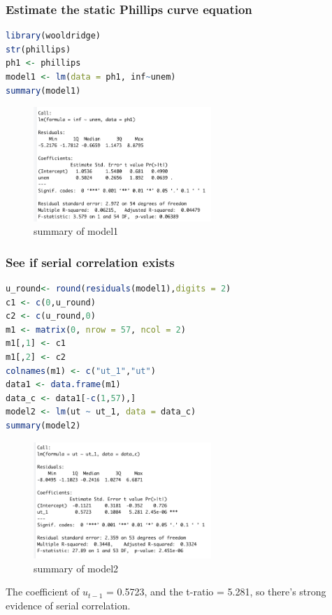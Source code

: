 \documentclass[12pt]{article}
\begin{document}
\subsubsection*{Estimate the static Phillips curve equation}
\begin{lstlisting}[language = R]
library(wooldridge)
str(phillips)
ph1 <- phillips
model1 <- lm(data = ph1, inf~unem)
summary(model1)
\end{lstlisting}
\begin{figure}[H]
    \centering
    \includegraphics*[width = 0.6\textwidth]{M1.png}
    \caption{summary of model1}
\end{figure}
    
\subsubsection*{See if serial correlation exists}
\begin{lstlisting}[language = R]
u_round<- round(residuals(model1),digits = 2)
c1 <- c(0,u_round)
c2 <- c(u_round,0)
m1 <- matrix(0, nrow = 57, ncol = 2)
m1[,1] <- c1
m1[,2] <- c2
colnames(m1) <- c("ut_1","ut")
data1 <- data.frame(m1)
data_c <- data1[-c(1,57),]
model2 <- lm(ut ~ ut_1, data = data_c)
summary(model2)
\end{lstlisting}
\begin{figure}[H]
    \centering
    \includegraphics*[width = 0.6\textwidth]{M2.png}
    \caption{summary of model2}
\end{figure}
The coefficient of $u_{t-1}$ = 0.5723, and the t-ratio = 5.281, so there's strong evidence of serial correlation.
\newline
\end{document}
